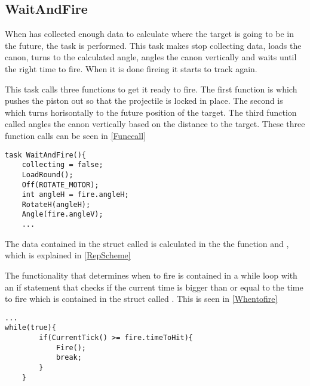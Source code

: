 \subsection{WaitAndFire}
When \name has collected enough data to calculate where the target is going to
be in the future, the task  is performed. This task makes
\name stop collecting data, loads the canon, turns to the calculated angle, angles the
canon vertically and waits until the right time to fire. When it is done fireing
it starts to track again.\nl

This task calls three functions to get it ready to fire. The first function is
 which pushes the piston out so that the projectile is locked
in place. The second is  which turns \name horisontally to the
future position of the target. The third function called  angles
the canon vertically based on the distance to the target. These three function calls can be seen in
\autoref{Funccall}\nl

\begin{minipage}[H]{\linewidth}
\begin{lstlisting}[caption = Function calls in WaitAndFire, label = Funccall] 
task WaitAndFire(){
    collecting = false;
    LoadRound();
    Off(ROTATE_MOTOR);
    int angleH = fire.angleH;
    RotateH(angleH);
    Angle(fire.angleV);
    ...
\end{lstlisting}
\end{minipage}

The data contained in the struct called  is calculated in the the
function  and , which is explained in
\autoref{RepScheme}

The functionality that determines when to fire is contained in a while loop with
an if statement that checks if the current time is bigger than or equal to the
time to fire which is contained in the struct called . This is seen
in \autoref{Whentofire}\nl
 
\begin{minipage}[H]{\linewidth}
\begin{lstlisting}[caption = While loop that determines when to fire, label =
Whentofire]
 ...
while(true){
        if(CurrentTick() >= fire.timeToHit){
            Fire();
            break;
        }
    }
\end{lstlisting}
\end{minipage}





